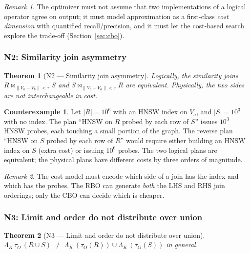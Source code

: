 \documentclass[sigconf,nonacm,review]{acmart}
\theoremstyle{plain}
\newtheorem{theorem}{Theorem}
\theoremstyle{definition}
\newtheorem{counterexample}{Counterexample}
\theoremstyle{remark}
\newtheorem{remark}{Remark}
\begin{document}
\begin{remark}
The optimizer must not assume that two implementations of a logical
operator agree on output; it must model approximation as a
first-class \emph{cost dimension} with quantified
recall/precision, and it must let the cost-based search explore the
trade-off (Section~\ref{sec:cbo}).
\end{remark}

\subsubsection{N2: Similarity join asymmetry}

\begin{theorem}[N2 --- Similarity join asymmetry]\label{thm:n2}
Logically, the similarity joins
$R \bowtie_{\lVert V_a-V_b\rVert<\tau} S$ and
$S \bowtie_{\lVert V_b-V_a\rVert<\tau} R$ are equivalent. Physically,
the two sides are not interchangeable in cost.
\end{theorem}

\begin{counterexample}\label{ce:n2}
Let $|R| = 10^6$ with an HNSW index on $V_a$, and $|S| = 10^3$ with
no index. The plan ``HNSW on $R$ probed by each row of $S$'' issues
$10^3$ HNSW probes, each touching a small portion of the graph. The
reverse plan ``HNSW on $S$ probed by each row of $R$'' would require
either building an HNSW index on $S$ (extra cost) or issuing $10^6$
probes. The two logical plans are equivalent; the physical plans
have different costs by three orders of magnitude.
\end{counterexample}

\begin{remark}
The cost model must encode which side of a join has the index and
which has the probes. The RBO can generate \emph{both} the LHS and
RHS join orderings; only the CBO can decide which is cheaper.
\end{remark}

\subsubsection{N3: Limit and order do not distribute over union}

\begin{theorem}[N3 --- Limit and order do not distribute over union]\label{thm:n3}
$\Lambda_K\, \tau_O\, (R \cup S) \;\neq\; \Lambda_K\, (\tau_O(R))
\cup \Lambda_K\, (\tau_O(S))$ in general.
\end{theorem}
\end{document}
